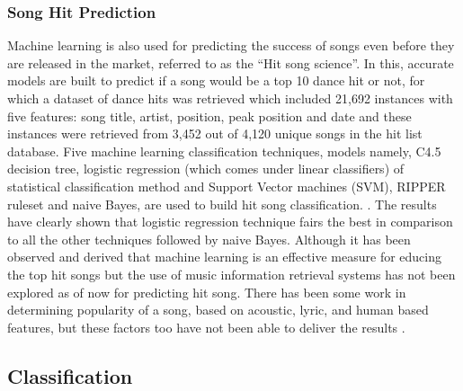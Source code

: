 \documentclass{proc}
\begin{document}
\subsubsection{Song Hit Prediction}
Machine learning is also used for predicting the success of songs even before they are released in the market, referred to as the “Hit song science”. In this, accurate models are built to predict if a song would be a top 10 dance hit or not, for which a dataset of dance hits was retrieved which included 21,692 instances with five features: song title, artist, position, peak position and date and these instances were retrieved from 3,452 out of 4,120 unique songs in the hit list database. Five machine learning classification techniques, models namely, C4.5 decision tree, logistic regression (which comes under linear classifiers) of statistical classification method and Support Vector machines (SVM), RIPPER ruleset and naive Bayes, are used to build hit song classification. . The results have clearly shown that logistic regression technique fairs the best in comparison to all the other techniques followed by naive Bayes. Although it has been observed and derived that machine learning is an effective measure for educing the top hit songs but the use of music information retrieval systems has not been explored as of now for predicting hit song. There has been some work in determining popularity of a song, based on acoustic, lyric, and human based features, but these factors too have not been able to deliver the results \cite{Herremans2013}.
\subsection{Classification}
\end{document}
